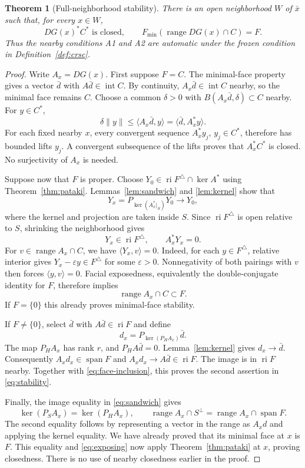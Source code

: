 \documentclass[11pt]{article}
\numberwithin{equation}{section}
\newtheorem{theorem}{Theorem}[section]
\theoremstyle{definition}
\theoremstyle{remark}
\DeclareMathOperator{\ri}{ri}
\DeclareMathOperator{\spann}{span}
\DeclareMathOperator{\range}{range}
\DeclareMathOperator{\interior}{int}
\newcommand{\xb}{\bar x}
\newcommand{\ip}[2]{\langle #1,#2\rangle}
\newcommand{\norm}[1]{\lVert #1\rVert}
\begin{document}
\begin{theorem}[Full-neighborhood stability]
\label{thm:stability}
There is an open neighborhood $W$ of $\xb$ such that, for every $x\in W$,
\begin{equation}
 DG(x)^*C^*\text{ is closed},
 \qquad F_{\min}(\range DG(x)\cap C)=F.
 \label{eq:stability}
\end{equation}
Thus the nearby conditions A1 and A2 are automatic under the frozen
condition in Definition~\ref{def:crsc}.
\end{theorem}
\begin{proof}
Write $A_x=DG(x)$. First suppose $F=C$. The minimal-face property gives
a vector $\bar d$ with $A\bar d\in\interior C$. By continuity,
$A_x\bar d\in\interior C$ nearby, so the minimal face remains $C$.
Choose a common $\delta>0$ with $B(A_x\bar d,\delta)\subset C$
nearby. For $y\in C^*$,
\[
 \delta\norm{y}\leq\ip{A_x\bar d}{y}
 =\ip{\bar d}{A_x^*y}.
\]
For each fixed nearby $x$, every convergent sequence $A_x^*y_j$,
$y_j\in C^*$, therefore has bounded lifts $y_j$. A convergent
subsequence of the lifts proves that $A_x^*C^*$ is closed.
No surjectivity of $A_x$ is needed.

Suppose now that $F$ is proper. Choose
$Y_0\in\ri F^\triangle\cap\ker A^*$ using
Theorem~\ref{thm:pataki}. Lemmas~\ref{lem:sandwich} and
\ref{lem:kernel} show that
\[
 Y_x=P_{\ker(A_x^*|_S)}Y_0
 \longrightarrow Y_0,
\]
where the kernel and projection are taken inside $S$.
Since $\ri F^\triangle$ is open relative to $S$, shrinking the
neighborhood gives
\begin{equation}
 Y_x\in\ri F^\triangle,\qquad A_x^*Y_x=0.
 \label{eq:exposing}
\end{equation}
For $v\in\range A_x\cap C$, we have $\ip{Y_x}{v}=0$.
Indeed, for each $y\in F^\triangle$, relative interior gives
$Y_x-\varepsilon y\in F^\triangle$ for some $\varepsilon>0$.
Nonnegativity of both pairings with $v$ then forces $\ip{y}{v}=0$.
Facial exposedness, equivalently the double-conjugate identity for $F$,
therefore implies
\begin{equation}
 \range A_x\cap C\subset F.
 \label{eq:face-inclusion}
\end{equation}
If $F=\{0\}$ this already proves minimal-face stability.

If $F\ne\{0\}$, select $\bar d$ with $A\bar d\in\ri F$ and define
\[
 d_x=P_{\ker(P_HA_x)}\bar d.
\]
The map $P_HA_x$ has rank $r$, and $P_HA\bar d=0$.
Lemma~\ref{lem:kernel} gives $d_x\to\bar d$. Consequently
$A_xd_x\in\spann F$ and $A_xd_x\to A\bar d\in\ri F$.
The image is in $\ri F$ nearby. Together with
\eqref{eq:face-inclusion}, this proves the second assertion in
\eqref{eq:stability}.

Finally, the image equality in \eqref{eq:sandwich} gives
\[
 \ker(P_SA_x)=\ker(P_HA_x),
 \qquad
 \range A_x\cap S^\perp=\range A_x\cap\spann F.
\]
The second equality follows by representing a vector in the range as
$A_xd$ and applying the kernel equality. We have already proved that its
minimal face at $x$ is $F$. This equality and \eqref{eq:exposing} now
apply Theorem~\ref{thm:pataki} at $x$, proving closedness.
There is no use of nearby closedness earlier in the proof.
\end{proof}
\end{document}
